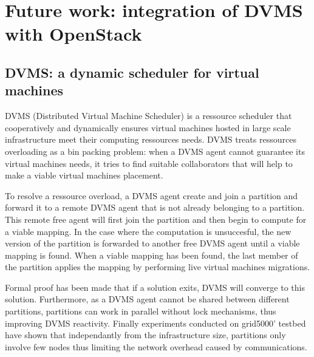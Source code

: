 \section{Future work: integration of DVMS with OpenStack}
\label{sec:future_work}

\subsection{DVMS: a dynamic scheduler for virtual machines}






DVMS \cite{quesnel:ispa2013} (Distributed Virtual Machine Scheduler) is a
ressource scheduler that cooperatively and dynamically ensures virtual machines
hosted in large scale infrastructure meet their computing ressources needs. DVMS
treats ressources overloading as a bin packing problem: when a DVMS agent cannot
guarantee its virtual machines needs, it tries to find suitable collaborators 
that will help to make a viable virtual machines placement.

To resolve a ressource overload, a DVMS agent create and join a partition and
forward it to a remote DVMS agent that is not already belonging to a partition.
This remote free agent will first join the partition and then begin to compute 
for a viable mapping. In the case where the computation is unsuccesful, the new 
version of the partition is forwarded to another free DVMS agent until a viable
mapping is found. When a viable mapping has been found, the last member of the
partition applies the mapping by performing live virtual machines migrations.

Formal proof \cite{quesnel:ispa2013} has been made that if a solution exits, 
DVMS will converge to this solution. Furthermore, as a DVMS agent cannot be
shared between different partitions, partitions can work in parallel without
lock mechanisms, thus improving DVMS reactivity. Finally experiments conducted 
on grid5000' testbed have shown that independantly from the infrastructure 
size, partitions only involve few nodes thus limiting the network overhead 
caused by communications.



